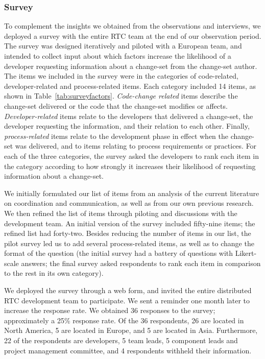 \subsubsection{Survey}
To complement the insights we obtained from the observations and interviews, we deployed a survey with the entire RTC team at the end of our observation period. The survey was designed iteratively and piloted with a European team, and intended to collect input about which factors increase the likelihood of a developer requesting information about a change-set from the change-set author. The items we included in the survey were in the categories of code-related, developer-related and process-related items. Each category included 14 items, as shown in Table~\ref{tab:surveyfactors}. \emph{Code-change related} items describe the change-set delivered or the code that the change-set modifies or affects. \emph{Developer-related} items relate to
the developers that delivered a change-set, the developer requesting the
information, and their relation to each other. Finally, \emph{process-related} items relate to the development phase in effect when the change-set was delivered, and to items relating to process requirements or practices. For each of the three categories, the survey asked the developers to rank each item in the category according to how strongly it increases their likelihood of requesting information about a change-set. 

We initially formulated our list of items from an analysis of the current literature on coordination and communication, as well as from our own previous research. We then refined the list of items through piloting and discussions with the development team. An initial version of the survey included fifty-nine items; the refined list had forty-two. Besides reducing the number of items in our list, the pilot survey led us to add several process-related items, as well as to change the format of the question (the initial survey had a battery of questions with Likert-scale answers; the final survey asked respondents to rank each item in comparison to the rest in its own category).

We deployed the survey through a web form, and invited the entire distributed RTC development team to participate. We sent a reminder one month later to increase the response rate. We obtained 36 responses to the survey; approximately a 25\% response rate.
Of the 36 respondents, 26 are located in North America, 5 are located in Europe, and 5 are located in Asia. Furthermore, 22 of the respondents are developers, 5 team leads, 5 component leads and project management committee, and 4 respondents withheld their information.

